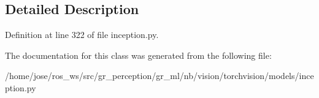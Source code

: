 \subsection{Detailed Description}


Definition at line 322 of file inception.\+py.



The documentation for this class was generated from the following file\+:\begin{DoxyCompactItemize}
\item 
/home/jose/ros\+\_\+ws/src/gr\+\_\+perception/gr\+\_\+ml/nb/vision/torchvision/models/inception.\+py\end{DoxyCompactItemize}
